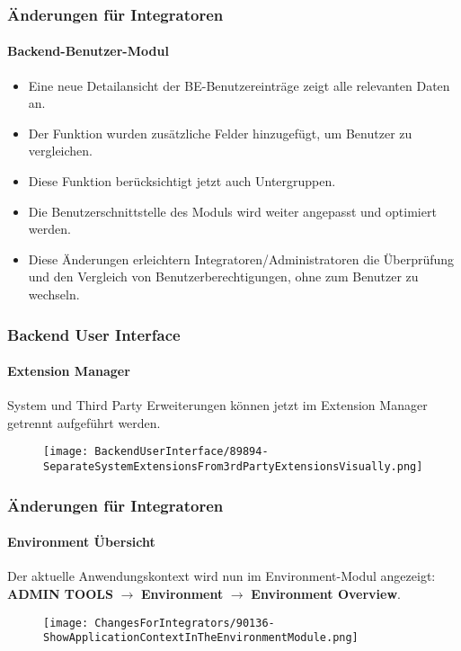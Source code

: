 
\begin{frame}[fragile]
	\frametitle{Änderungen für Integratoren}
	\framesubtitle{Backend-Benutzer-Modul}

	\begin{itemize}
		\item Eine neue Detailansicht der BE-Benutzereinträge zeigt alle relevanten Daten an.
		\item Der Funktion wurden zusätzliche Felder hinzugefügt, um Benutzer zu vergleichen.
		\item Diese Funktion berücksichtigt jetzt auch Untergruppen.
		\item Die Benutzerschnittstelle des Moduls wird weiter angepasst und optimiert werden.
		\item Diese Änderungen erleichtern Integratoren/Administratoren die 
			Überprüfung und den Vergleich von Benutzerberechtigungen, ohne zum Benutzer zu wechseln.
	\end{itemize}

\end{frame}


\begin{frame}[fragile]
	\frametitle{Backend User Interface}
	\framesubtitle{Extension Manager}

	System und Third Party Erweiterungen können jetzt im Extension Manager getrennt aufgeführt werden.

	\begin{figure}
		\texttt{[image: BackendUserInterface/89894-SeparateSystemExtensionsFrom3rdPartyExtensionsVisually.png]}
	\end{figure}

\end{frame}


\begin{frame}[fragile]
	\frametitle{Änderungen für Integratoren}
	\framesubtitle{Environment Übersicht}

	Der aktuelle Anwendungskontext wird nun im Environment-Modul angezeigt:\newline
	\textbf{ADMIN TOOLS} $\rightarrow$ \textbf{Environment} $\rightarrow$ \textbf{Environment Overview}.

	\begin{figure}
		\texttt{[image: ChangesForIntegrators/90136-ShowApplicationContextInTheEnvironmentModule.png]}
	\end{figure}

\end{frame}

